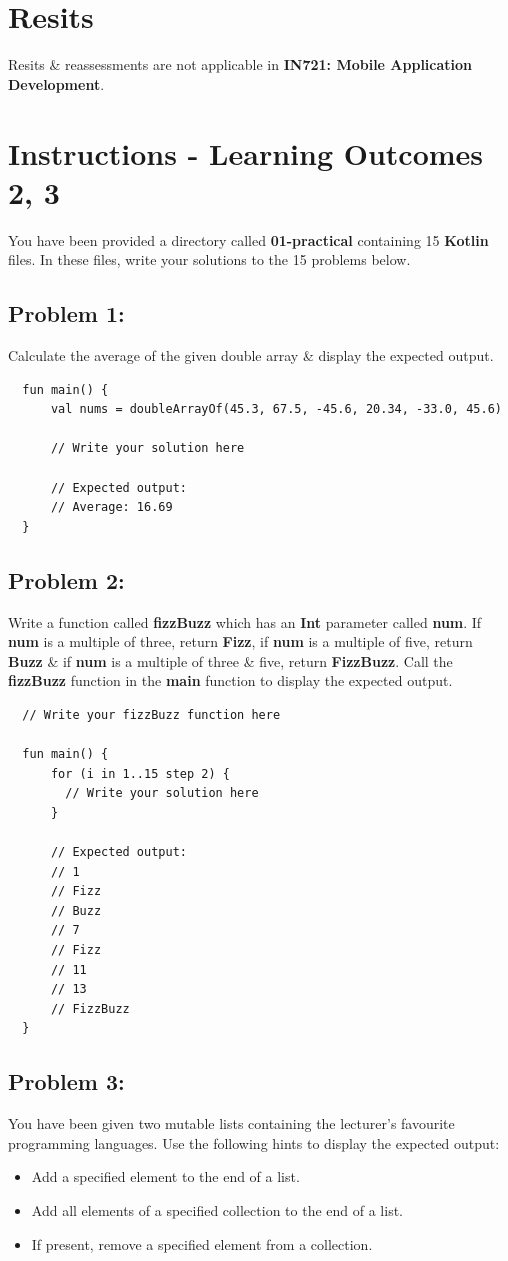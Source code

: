 \documentclass{article}
\begin{document}
\section*{Resits}
Resits \& reassessments are not applicable in \textbf{IN721: Mobile Application Development}.

\section*{Instructions - Learning Outcomes 2, 3}
You have been provided a directory called \textbf{01-practical} containing 15 \textbf{Kotlin} files. In these files, write your solutions to the 15 problems below. 

\subsection*{Problem 1:} 
Calculate the average of the given double array \& display the expected output.

\begin{verbatim}
  fun main() {
      val nums = doubleArrayOf(45.3, 67.5, -45.6, 20.34, -33.0, 45.6)

      // Write your solution here

      // Expected output:
      // Average: 16.69 
  }
\end{verbatim}

\subsection*{Problem 2:}
Write a function called \textbf{fizzBuzz} which has an \textbf{Int} parameter called \textbf{num}. If \textbf{num} is a multiple of three, return \textbf{Fizz}, if \textbf{num} is a multiple of five, return \textbf{Buzz} \& if \textbf{num} is a multiple of three \& five, return \textbf{FizzBuzz}. Call the \textbf{fizzBuzz} function in the \textbf{main} function to display the expected output.

\begin{verbatim}
  // Write your fizzBuzz function here
  
  fun main() {
      for (i in 1..15 step 2) {
        // Write your solution here
      }

      // Expected output:
      // 1
      // Fizz
      // Buzz
      // 7
      // Fizz
      // 11
      // 13
      // FizzBuzz
  }
\end{verbatim}

\subsection*{Problem 3:} You have been given two mutable lists containing the lecturer's favourite programming languages. Use the following hints to display the expected output:
\begin{itemize}
  \item Add a specified element to the end of a list.
  \item Add all elements of a specified collection to the end of a list.
  \item If present, remove a specified element from a collection.
\end{itemize}
\end{document}
